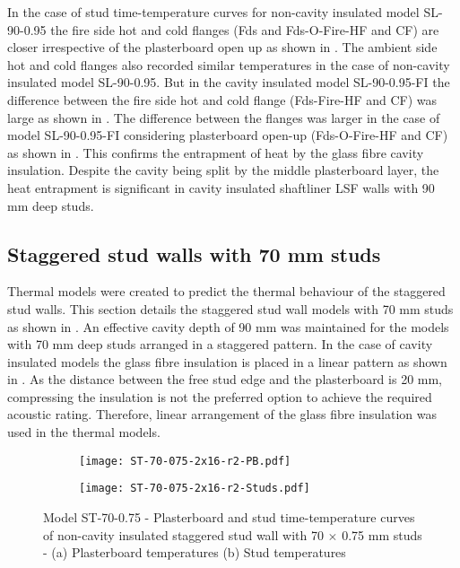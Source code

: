 In the case of stud time-temperature curves for non-cavity insulated model SL-90-0.95 the fire side hot and cold flanges (Fds and Fds-O-Fire-HF and CF) are closer irrespective of the plasterboard open up as shown in . The ambient side hot and cold flanges also recorded similar temperatures in the case of non-cavity insulated model SL-90-0.95. But in the cavity insulated model SL-90-0.95-FI the difference between the fire side hot and cold flange (Fds-Fire-HF and CF) was large as shown in . The difference between the flanges was larger in the case of model SL-90-0.95-FI considering plasterboard open-up (Fds-O-Fire-HF and CF) as shown in . This confirms the entrapment of heat by the glass fibre cavity insulation. Despite the cavity being split by the middle plasterboard layer, the heat entrapment is significant in cavity insulated shaftliner LSF walls with 90 mm deep studs. 

\subsection{Staggered stud walls with 70 mm studs}

Thermal models were created to predict the thermal behaviour of the staggered stud walls. This section details the staggered stud wall models with 70 mm studs as shown in . An effective cavity depth of 90 mm was maintained for the models with 70 mm deep studs arranged in a staggered pattern. In the case of cavity insulated models the glass fibre insulation is placed in a linear pattern as shown in . As the distance between the free stud edge and the plasterboard is 20 mm, compressing the insulation is not the preferred option to achieve the required acoustic rating. Therefore, linear arrangement of the glass fibre insulation was used in the thermal models. 
\begin{figure}[!htbp]
	\centering
	\begin{subfigure}[b]{0.6\textwidth}
		\centering
		\texttt{[image: ST-70-075-2x16-r2-PB.pdf]}
		\caption{}
		\label{subfig:ST-70-075-2x16-r2-PB}
	\end{subfigure}
	\begin{subfigure}[b]{0.6\textwidth}
		\centering
		\texttt{[image: ST-70-075-2x16-r2-Studs.pdf]}
		\caption{}
		\label{subfig:ST-70-075-2x16-r2-Studs}
	\end{subfigure}
	   \caption{Model ST-70-0.75 - Plasterboard and stud time-temperature curves of non-cavity insulated staggered stud wall with 70 $\times$ 0.75 mm studs - (a) Plasterboard temperatures (b) Stud temperatures}
	   \label{fig:ST-70-075-2x16-r2}
\end{figure}

